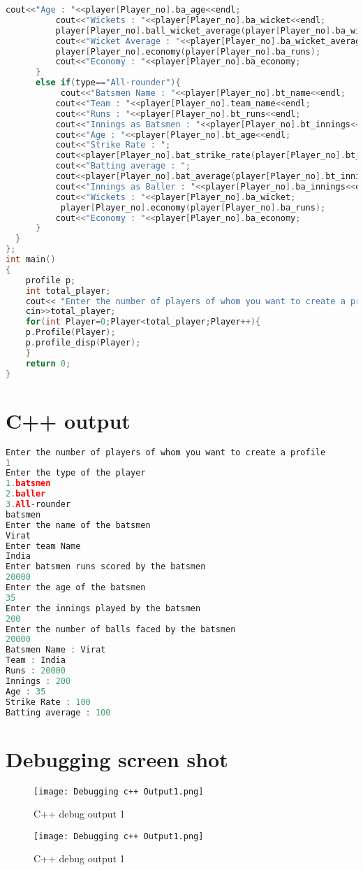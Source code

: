 \documentclass{article}
\begin{document}
\begin{lstlisting}[style=chstyle,language=C++]
          cout<<"Age : "<<player[Player_no].ba_age<<endl;
          cout<<"Wickets : "<<player[Player_no].ba_wicket<<endl;
          player[Player_no].ball_wicket_average(player[Player_no].ba_wicket,player[Player_no].ba_runs);
          cout<<"Wicket Average : "<<player[Player_no].ba_wicket_average;
          player[Player_no].economy(player[Player_no].ba_runs);
          cout<<"Economy : "<<player[Player_no].ba_economy;
      }
      else if(type=="All-rounder"){
           cout<<"Batsmen Name : "<<player[Player_no].bt_name<<endl;
          cout<<"Team : "<<player[Player_no].team_name<<endl;
          cout<<"Runs : "<<player[Player_no].bt_runs<<endl;
          cout<<"Innings as Batsmen : "<<player[Player_no].bt_innings<<endl;
          cout<<"Age : "<<player[Player_no].bt_age<<endl;
          cout<<"Strike Rate : ";
          cout<<player[Player_no].bat_strike_rate(player[Player_no].bt_balls_faced,player[Player_no].bt_runs)<<endl;
          cout<<"Batting average : ";
          cout<<player[Player_no].bat_average(player[Player_no].bt_innings,player[Player_no].bt_runs)<<endl;
          cout<<"Innings as Baller : "<<player[Player_no].ba_innings<<endl;
          cout<<"Wickets : "<<player[Player_no].ba_wicket;
           player[Player_no].economy(player[Player_no].ba_runs);
          cout<<"Economy : "<<player[Player_no].ba_economy;
      }
  }
};  
int main()
{
    profile p;
    int total_player;
    cout<< "Enter the number of players of whom you want to create a profile"<<endl;
    cin>>total_player;
    for(int Player=0;Player<total_player;Player++){
    p.Profile(Player);
    p.profile_disp(Player);
    }
    return 0;
}
\end{lstlisting}
\section{C++ output}
\begin{lstlisting}[style=chstyle,language=C++]
Enter the number of players of whom you want to create a profile
1   
Enter the type of the player 
1.batsmen
2.baller
3.All-rounder
batsmen
Enter the name of the batsmen
Virat
Enter team Name
India
Enter batsmen runs scored by the batsmen
20000
Enter the age of the batsmen
35
Enter the innings played by the batsmen
200 
Enter the number of balls faced by the batsmen
20000
Batsmen Name : Virat
Team : India
Runs : 20000
Innings : 200
Age : 35
Strike Rate : 100
Batting average : 100
\end{lstlisting}
\section{Debugging screen shot}
\begin{figure}
    \centering
    \texttt{[image: Debugging c++ Output1.png]}
    \caption{C++ debug output 1}
    \label{fig:my_label}
\end{figure}
\begin{figure}
    \centering
    \texttt{[image: Debugging c++ Output1.png]}
    \caption{C++ debug output 1}
    \label{fig:my_label}
\end{figure}
\end{document}

